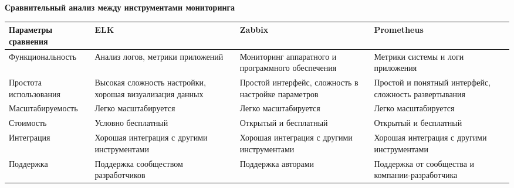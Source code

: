  \hypertarget{app-b}{\label{app-b}}

\begin{center}
    \textbf{Сравнительный анализ между инструментами мониторинга}
\end{center}
\vspace{\baselineskip}

\begingroup
\flushbottom
{} %
\small\begin{longtable}{|p{38mm}|p{34mm}|p{32mm}|p{33mm}|}
    \hline
    Параметры сравнения    & ELK                                                      & Zabbix                                              & Prometheus                                            \\ \hline
    Функциональность       & Анализ логов, метрики приложений                         & Мониторинг аппаратного и программного обеспечения   & Метрики системы и логи приложения                     \\ \hline
    Простота использования & Высокая сложность настройки, хорошая визуализация данных & Простой интерфейс, сложность в настройке параметров & Простой и понятный интерфейс, сложность развертывания \\ \hline
    Масштабируемость       & Легко масштабируется                                     & Легко масштабируется                                & Легко масштабируется                                  \\ \hline
    Стоимость              & Условно бесплатный                                       & Открытый и бесплатный                               & Открытый и бесплатный                                 \\ \hline
    Интеграция             & Хорошая интеграция с другими инструментами               & Хорошая интеграция с другими инструментами          & Хорошая интеграция с другими инструментами            \\ \hline
    Поддержка              & Поддержка сообществом разработчиков                      & Поддержка авторами                                  & Поддержка от сообщества и компании-разработчика       \\ \hline
\end{longtable}
\endgroup
\clearpage
